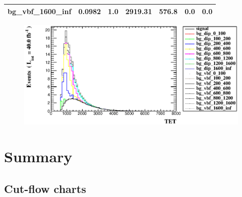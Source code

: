 \documentclass[a4paper, 10pt]{article}
\begin{document}
\begin{table}[H]
\begin{center}
\begin{tabular}{|m{23.0mm}|m{23.0mm}|m{18.0mm}|m{19.0mm}|m{19.0mm}|m{19.0mm}|m{19.0mm}|}
      \hline
      {\cellcolor{white}         bg\_vbf\_1600\_inf}& {\cellcolor{white}         0.0982}& {\cellcolor{white}         1.0}& {\cellcolor{white}         2919.31}& {\cellcolor{white}         576.8}& {\cellcolor{green}         0.0}& {\cellcolor{green}         0.0}\\
\hline
    \end{tabular}
  \end{center}
\end{table}

\begin{figure}[H]
  \begin{center}
    \includegraphics[scale=0.45]{selection_14.eps}\\
\caption{   }
  \end{center}
\end{figure}
\newpage
\section{ Summary}

\subsection{Cut-flow charts}
\end{document}
